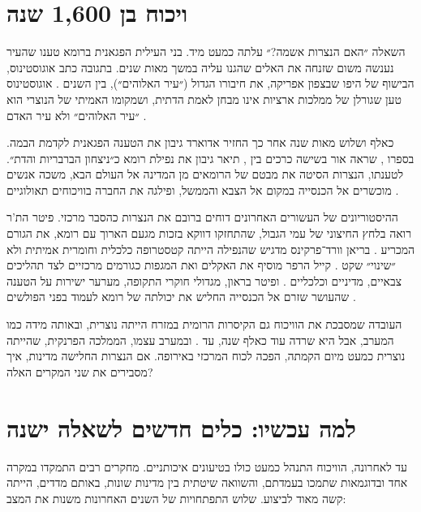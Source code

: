 \section{ויכוח בן 1,600 שנה}
\label{sec:intro-debate}

השאלה ״האם הנצרות אשמה?״ עלתה כמעט מיד. בני העילית הפגאנית ברומא טענו שהעיר נענשה משום שזנחה את האלים שהגנו עליה במשך מאות שנים. בתגובה כתב אוגוסטינוס, הבישוף של היפו שבצפון אפריקה, את חיבורו הגדול  (״עיר האלוהים״), בין השנים . אוגוסטינוס טען שגורלן של ממלכות ארציות אינו מבחן לאמת הדתית, ושמקומו האמיתי של הנוצרי הוא ״עיר האלוהים״ ולא עיר האדם \cite{augustine_citygod}.

כאלף ושלוש מאות שנה אחר כך החזיר אדוארד גיבון את הטענה הפגאנית לקדמת הבמה. בספרו , שראה אור בשישה כרכים בין , תיאר גיבון את נפילת רומא כ״ניצחון הברבריות והדת״. לטענתו, הנצרות הסיטה את מבטם של הרומאים מן המדינה אל העולם הבא, משכה אנשים מוכשרים אל הכנסייה במקום אל הצבא והממשל, ופילגה את החברה בוויכוחים תאולוגיים \cite{gibbon_decline}.

ההיסטוריונים של העשורים האחרונים דוחים ברובם את הנצרות כהסבר מרכזי. פיטר הת'ר רואה בלחץ החיצוני של עמי הגבול, שהתחזקו דווקא בזכות מגעם הארוך עם רומא, את הגורם המכריע \cite{heather2005fall}. בריאן וורד־פרקינס מדגיש שהנפילה הייתה קטסטרופה כלכלית וחומרית אמיתית ולא ״שינוי״ שקט \cite{wardperkins2005fall}. קייל הרפר מוסיף את האקלים ואת המגפות כגורמים מרכזיים לצד תהליכים צבאיים, מדיניים וכלכליים \cite{harper2017fate}. ופיטר בראון, מגדולי חוקרי התקופה, מערער ישירות על הטענה שהעושר שזרם אל הכנסייה החליש את יכולתה של רומא לעמוד בפני הפולשים \cite{brown2012needle}.

\begin{keybox}{העובדה שמסבכת את הוויכוח}
גם הקיסרות הרומית במזרח הייתה נוצרית, ובאותה מידה כמו המערב, אבל היא שרדה עוד כאלף שנה, עד . ובמערב עצמו, הממלכה הפרנקית, שהייתה נוצרית כמעט מיום הקמתה, הפכה לכוח המרכזי באירופה. אם הנצרות החלישה מדינות, איך מסבירים את שני המקרים האלה?
\end{keybox}

\section{למה עכשיו: כלים חדשים לשאלה ישנה}
\label{sec:intro-why-now}

עד לאחרונה, הוויכוח התנהל כמעט כולו בטיעונים איכותניים. מחקרים רבים התמקדו במקרה אחד ובדוגמאות שתמכו בעמדתם, והשוואה שיטתית בין מדינות שונות, באותם מדדים, הייתה קשה מאוד לביצוע. שלוש התפתחויות של השנים האחרונות משנות את המצב:

